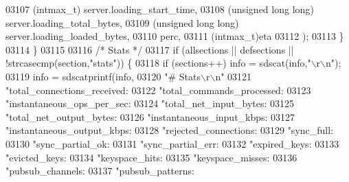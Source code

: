 \begin{DoxyCode}
{{{{{{{{{{{{{{{{{{{{{{{{{{{{{{{{{{{{{{{{{{{{{{{{{{{{{{{{{{{{{{{{{{{{{{{{{{{{{{{{{{{{{{{{{{{{{{{{{{{{{{{{{{{{{{{{{{03107                 (intmax\_t) server.loading\_start\_time,
03108                 (\textcolor{keywordtype}{unsigned} \textcolor{keywordtype}{long} \textcolor{keywordtype}{long}) server.loading\_total\_bytes,
03109                 (\textcolor{keywordtype}{unsigned} \textcolor{keywordtype}{long} \textcolor{keywordtype}{long}) server.loading\_loaded\_bytes,
03110                 perc,
03111                 (intmax\_t)eta
03112             );
03113         \}
03114     \}
03115 
03116     \textcolor{comment}{/* Stats */}
03117     \textcolor{keywordflow}{if} (allsections || defsections || !strcasecmp(section,\textcolor{stringliteral}{"stats"})) \{
03118         \textcolor{keywordflow}{if} (sections++) info = sdscat(info,\textcolor{stringliteral}{"\(\backslash\)r\(\backslash\)n"});
03119         info = sdscatprintf(info,
03120             \textcolor{stringliteral}{"# Stats\(\backslash\)r\(\backslash\)n"}
03121             \textcolor{stringliteral}{"total\_connections\_received:%
03122             \textcolor{stringliteral}{"total\_commands\_processed:%
03123             \textcolor{stringliteral}{"instantaneous\_ops\_per\_sec:%
03124             \textcolor{stringliteral}{"total\_net\_input\_bytes:%
03125             \textcolor{stringliteral}{"total\_net\_output\_bytes:%
03126             \textcolor{stringliteral}{"instantaneous\_input\_kbps:%
03127             \textcolor{stringliteral}{"instantaneous\_output\_kbps:%
03128             \textcolor{stringliteral}{"rejected\_connections:%
03129             \textcolor{stringliteral}{"sync\_full:%
03130             \textcolor{stringliteral}{"sync\_partial\_ok:%
03131             \textcolor{stringliteral}{"sync\_partial\_err:%
03132             \textcolor{stringliteral}{"expired\_keys:%
03133             \textcolor{stringliteral}{"evicted\_keys:%
03134             \textcolor{stringliteral}{"keyspace\_hits:%
03135             \textcolor{stringliteral}{"keyspace\_misses:%
03136             \textcolor{stringliteral}{"pubsub\_channels:%
03137             \textcolor{stringliteral}{"pubsub\_patterns:%
}}}}}}}}}}}}}}}}}}}}}}}}}}}}}}}}}}}}}}}}}}}}}}}}}}}}}}}}}}}}}}}}}}}}}}}}}}}}}}}}}}}}}}}}}}}}}}}}}}}}}}}}}}}}}}}}}}}}}}}}}}}}}}}}}}}
\end{DoxyCode}
